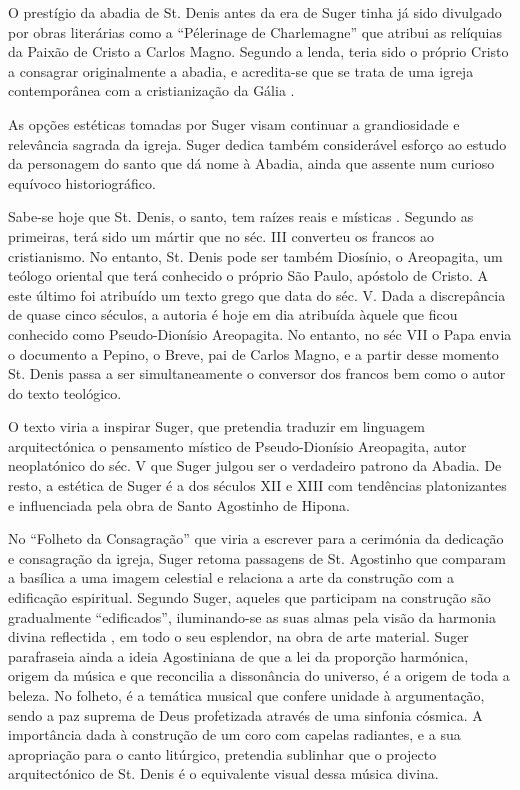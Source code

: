 \documentclass{article}
\begin{document}
O prestígio da abadia de St. Denis antes da era de Suger tinha já sido
divulgado por obras literárias como a ``Pélerinage de Charlemagne''
que atribui as relíquias da Paixão de Cristo a Carlos Magno. Segundo a
lenda, teria sido o próprio Cristo a consagrar originalmente a abadia,
e acredita-se que se trata de uma igreja contemporânea com a
cristianização da Gália \cite{wikipedia-abadia}. 

As opções estéticas tomadas por Suger visam continuar a grandiosidade
e relevância sagrada da igreja. Suger dedica também considerável
esforço ao estudo da personagem do santo que dá nome à Abadia, ainda
que assente num curioso equívoco historiográfico.

Sabe-se hoje que St. Denis, o santo, tem raízes reais e místicas
\cite{calado}. Segundo as primeiras, terá sido um mártir que no
séc. III converteu os francos ao cristianismo. No entanto, St. Denis
pode ser também Diosínio, o Areopagita, um teólogo oriental que terá
conhecido o próprio São Paulo, apóstolo de Cristo. A este último foi
atribuído um texto grego que data do séc. V. Dada a discrepância de
quase cinco séculos, a autoria é hoje em dia atribuída àquele que
ficou conhecido como Pseudo-Dionísio Areopagita. No entanto, no séc
VII o Papa envia o documento a Pepino, o Breve, pai de Carlos Magno, e
a partir desse momento St. Denis passa a ser simultaneamente o
conversor dos francos bem como o autor do texto teológico.

O texto viria a inspirar Suger, que pretendia traduzir em linguagem
arquitectónica o pensamento místico de Pseudo-Dionísio Areopagita,
autor neoplatónico do séc. V que Suger julgou ser o verdadeiro patrono
da Abadia. De resto, a estética de Suger é a dos séculos XII e XIII
com tendências platonizantes e influenciada pela obra de Santo
Agostinho de Hipona.

No ``Folheto da Consagração'' que viria a escrever para a cerimónia da
dedicação e consagração da igreja, Suger retoma passagens de
St. Agostinho que comparam a basílica a uma imagem celestial e
relaciona a arte da construção com a edificação espiritual. Segundo
Suger, aqueles que participam na construção são gradualmente
``edificados'', iluminando-se as suas almas pela visão da harmonia
divina reflectida , em todo o seu esplendor, na obra de arte
material. Suger parafraseia ainda a ideia Agostiniana de que a lei da
proporção harmónica, origem da música e que reconcilia a dissonância
do universo, é a origem de toda a beleza. No folheto, é a temática
musical que confere unidade à argumentação, sendo a paz suprema de
Deus profetizada através de uma sinfonia cósmica. A importância dada à
construção de um coro com capelas radiantes, e a sua apropriação para
o canto litúrgico, pretendia sublinhar que o projecto arquitectónico
de St. Denis é o equivalente visual dessa música divina.
\end{document}

